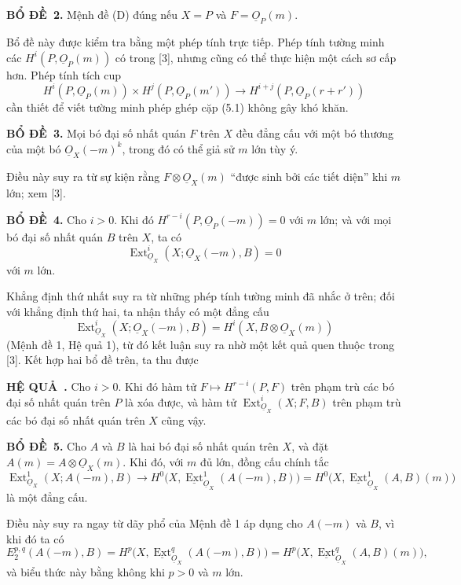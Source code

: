 \documentclass[11pt,twoside,openany]{book}
\numberwithin{equation}{section}
\newcommand{\src}[1]{%
  \phantomsection\hypertarget{src:\fgasourceid:#1}{}%
  \marginpar{\raggedleft\footnotesize\sffamily #1}%
}
\newcommand{\fgasourceid}{unset}
\newcommand{\Osh}{\underline{O}}
\newcommand{\Extsh}{\underline{\operatorname{Ext}}}
\newcommand{\result}[2]{\par\medskip\noindent\textbf{#1\if\relax\detokenize{#2}\relax\else\ #2\fi.}\quad}
\begin{document}
\result{BỔ ĐỀ}{2} Mệnh đề (D) đúng nếu $X=P$ và $F=\Osh_P(m)$.

Bổ đề này được kiểm tra bằng một phép tính trực tiếp. Phép tính tường minh các
$H^{i}(P,\Osh_P(m))$ có trong [3], nhưng cũng có thể thực hiện một cách sơ cấp
hơn. Phép tính tích cup
\[
  H^{i}(P,\Osh_P(m))\times H^{j}(P,\Osh_P(m'))
  \longrightarrow H^{i+j}(P,\Osh_P(r+r'))
\]
cần thiết để viết tường minh phép ghép cặp (5.1) không gây khó khăn.

\result{BỔ ĐỀ}{3} Mọi bó đại số nhất quán $F$ trên $X$ đều đẳng cấu với một
bó thương của một bó $\Osh_X(-m)^{k}$, trong đó có thể giả sử $m$ lớn tùy ý.

Điều này suy ra từ sự kiện rằng $F\otimes\Osh_X(m)$ ``được sinh bởi các tiết
diện'' khi $m$ lớn; xem [3].

\result{BỔ ĐỀ}{4} Cho $i>0$. Khi đó
$H^{r-i}(P,\Osh_P(-m))=0$ với $m$ lớn; và với mọi bó đại số nhất quán $B$
trên $X$, ta có
\[
  \operatorname{Ext}_{\Osh_X}^{i}(X;\Osh_X(-m),B)=0
\]
với $m$ lớn.

Khẳng định thứ nhất suy ra từ những phép tính tường minh đã nhắc ở trên; đối
với khẳng định thứ hai, ta nhận thấy có một đẳng cấu
\[
  \operatorname{Ext}_{\Osh_X}^{i}(X;\Osh_X(-m),B)
  =H^{i}(X,B\otimes\Osh_X(m))
\]
(Mệnh đề 1, Hệ quả 1), từ đó kết luận suy ra nhờ một kết quả quen thuộc trong
[3]. Kết hợp hai bổ đề trên, ta thu được

\result{HỆ QUẢ}{} Cho $i>0$. Khi đó hàm tử
$F\longmapsto H^{r-i}(P,F)$ trên phạm trù các bó đại số nhất quán trên $P$
là xóa được, và hàm tử
$\operatorname{Ext}_{\Osh_X}^{i}(X;F,B)$ trên phạm trù các bó đại số nhất quán
trên $X$ cũng vậy.


\src{184}
\result{BỔ ĐỀ}{5} Cho $A$ và $B$ là hai bó đại số nhất quán trên
$X$, và đặt $A(m)=A\otimes\Osh_X(m)$. Khi đó, với $m$ đủ lớn,
đồng cấu chính tắc
\[
  \operatorname{Ext}_{\Osh_X}^{1}(X;A(-m),B)
  \longrightarrow H^{0}\bigl(X,\Extsh_{\Osh_X}^{1}(A(-m),B)\bigr)
  =H^{0}\bigl(X,\Extsh_{\Osh_X}^{1}(A,B)(m)\bigr)
\]
là một đẳng cấu.

Điều này suy ra ngay từ dãy phổ của Mệnh đề 1 áp dụng cho
$A(-m)$ và $B$, vì khi đó ta có
\[
  E_{2}^{p,q}(A(-m),B)
  =H^{p}\bigl(X,\Extsh_{\Osh_X}^{q}(A(-m),B)\bigr)
  =H^{p}\bigl(X,\Extsh_{\Osh_X}^{q}(A,B)(m)\bigr),
\]
và biểu thức này bằng không khi $p>0$ và $m$ lớn.
\end{document}
